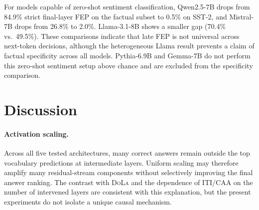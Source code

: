 \documentclass[11pt]{article}
\newcommand{\iti}{\textsc{ITI}}
\newcommand{\dola}{\textsc{DoLa}}
\newcommand{\caa}{\textsc{CAA}}
\begin{document}
\begin{table}[t]
\centering
\small
{}
\caption{Control task comparison on SST-2 sentiment classification. Models capable of zero-shot sentiment classification (Qwen, Mistral) show dramatically lower late crystallization on SST-2 than on factual retrieval. Factual Late\% computed on the same 200-sample subset used for control evaluation. $^\dagger$Base models unable to perform zero-shot sentiment classification (excluded from the specificity comparison).}

\label{tab:control_tasks}
\end{table}

For models capable of zero-shot sentiment classification, Qwen2.5-7B drops from 84.9\% strict final-layer FEP on the factual subset to 0.5\% on SST-2, and Mistral-7B drops from 26.8\% to 2.0\%. Llama-3.1-8B shows a smaller gap (70.4\% vs.\ 49.5\%). These comparisons indicate that late FEP is not universal across next-token decisions, although the heterogeneous Llama result prevents a claim of factual specificity across all models. Pythia-6.9B and Gemma-7B do not perform this zero-shot sentiment setup above chance and are excluded from the specificity comparison.


\section{Discussion}
\label{sec:discussion}

\paragraph{Activation scaling.} Across all five tested architectures, many correct answers remain outside the top vocabulary predictions at intermediate layers. Uniform scaling may therefore amplify many residual-stream components without selectively improving the final answer ranking. The contrast with \dola{} and the dependence of \iti{}/\caa{} on the number of intervened layers are consistent with this explanation, but the present experiments do not isolate a unique causal mechanism.
\end{document}

